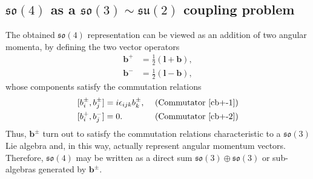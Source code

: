 \documentclass[12pt,a4paper]{report}
\theoremstyle{definition}
\theoremstyle{remark}
\theoremstyle{remark}
\begin{document}
\subsection{$\mathfrak{so}(4)$ as a $\mathfrak{so}(3)\sim \mathfrak{su}(2)$ coupling problem}
The obtained $\mathfrak{so}(4)$ representation can be viewed as an addition of two angular momenta, by defining the two vector operators
\begin{equation}\label{eso4.4}
\begin{aligned}
\textbf{b}^{+}&=\frac{1}{2}(\textbf{l}+\textbf{b}), \\
\textbf{b}^{-}&=\frac{1}{2}(\textbf{l}-\textbf{b}),
\end{aligned}
\end{equation}
whose components satisfy the commutation relations 
\begin{equation*}
\begin{aligned}
&[b_i^{\pm},b_j^{\pm}]=i\epsilon_{ijk}b_k^{\pm}, &&\text{ (Commutator~\ref{cb+-1})}\\
&[b_i^{+},b_j^{-}]=0. &&\text{ (Commutator~\ref{cb+-2})}
\end{aligned}
\end{equation*}
Thus, $\textbf{b}^{\pm}$ turn out to satisfy the commutation relations characteristic to a $\mathfrak{so}(3)$ Lie algebra and, in this way, actually represent angular momentum vectors. Therefore, $\mathfrak{so}(4)$ may be written as a direct sum $\mathfrak{so}(3)\oplus \mathfrak{so}(3)$ or sub-algebras generated by $\textbf{b}^{\pm}$. 
\end{document}
